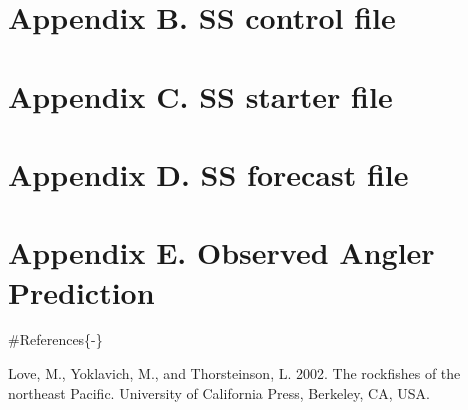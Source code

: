 \documentclass[12pt,]{article}
\begin{document}
\section*{Appendix B. SS control
file}\label{appendix-b.-ss-control-file}

\renewcommand{\thepage}{B-\arabic{page}}
\renewcommand{\thefigure}{B\arabic{figure}}
\renewcommand{\thetable}{B\arabic{table}}

\setcounter{page}{1} \setcounter{figure}{1} \setcounter{table}{1}

\newpage

\section*{Appendix C. SS starter
file}\label{appendix-c.-ss-starter-file}

\renewcommand{\thepage}{C-\arabic{page}}
\renewcommand{\thefigure}{C\arabic{figure}}
\renewcommand{\thetable}{C\arabic{table}}

\setcounter{page}{1} \setcounter{figure}{1} \setcounter{table}{1}

\newpage

\section*{Appendix D. SS forecast
file}\label{appendix-d.-ss-forecast-file}

\renewcommand{\thepage}{D-\arabic{page}}
\renewcommand{\thefigure}{D\arabic{figure}}
\renewcommand{\thetable}{D\arabic{table}}

\setcounter{page}{1} \setcounter{figure}{1} \setcounter{table}{1}

\newpage

\section*{Appendix E. Observed Angler
Prediction}\label{appendix-e.-observed-angler-prediction}

\renewcommand{\thepage}{E-\arabic{page}}
\renewcommand{\thefigure}{E\arabic{figure}}
\renewcommand{\thetable}{E\arabic{table}}

\setcounter{page}{1} \setcounter{figure}{1} \setcounter{table}{1}

\newpage

\thispagestyle{empty} \#References\{-\}

Love, M., Yoklavich, M., and Thorsteinson, L. 2002. The rockfishes of
the northeast Pacific. University of California Press, Berkeley, CA,
USA.
\end{document}
